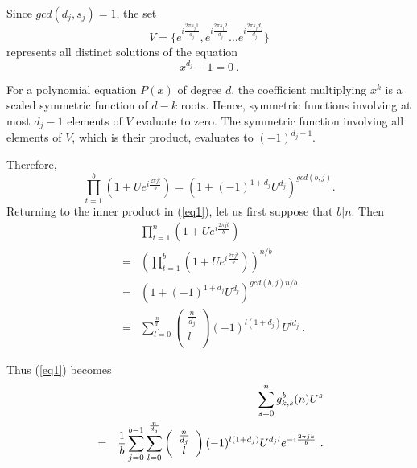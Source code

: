 Since $gcd(d_j,s_j)=1$, the set \[V=\{e^{i\frac{2\pi s_j 1}{d_j}},
e^{i\frac{2\pi s_j 2}{d_j}}\dots e^{i\frac{2\pi s_j d_j}{d_j}}\}\]
represents all distinct solutions of the equation
\begin{equation}\label{poly}
x^{d_j}-1=0~.
\end{equation}

For a polynomial equation $P(x)$ of degree $d$, the coefficient
multiplying $x^k$ is a scaled symmetric function of $d-k$ roots.
Hence, symmetric functions involving at most $d_j-1$ elements of $V$
evaluate to zero. The symmetric function involving all elements of
$V$, which is their product, evaluates to $(-1)^{d_j+1}$.

Therefore,
\begin{equation}
\prod_{t=1}^b (1+Ue^{i\frac{2\pi
jt}{b}})=\left(1+(-1)^{1+d_j}U^{d_j} \right)^{gcd(b,j)}.
\end{equation}
 Returning to the inner product in (\ref{eq1}), let us first
suppose that $b|n$. Then
\begin{equation}
\begin{array}{lll}
{}&{}&\prod_{t=1}^n \left(1+Ue^{i\frac{2\pi jt}{b}}\right)\\
{}&=&\left(\prod_{t=1}^b \left(1+Ue^{i\frac{2\pi
jt}{b}}\right)\right)^{n/b}\\
{}&=&\left(1+(-1)^{1+d_j}U^{d_j}
\right)^{gcd(b,j)n/b}\\
{}&=&\sum_{l=0}^{\frac{n}{d_j}} \left( \begin{array}{c}
                             \frac{n}{d_j} \\
                             l \\
                           \end{array}
                           \right)
(-1)^{l(1+d_j)}U^{ld_j}~.
\end{array}
\end{equation}

Thus (\ref{eq1}) becomes
\begin{eqnarray*}
{}&{}&\sum_{s=0}^n g^b_{k,s}(n)U^s\\&=&\frac{1}{b}\sum_{j=0}^{b-1}
\sum_{l=0}^{\frac{n}{d_j}} \left(
\begin{array}{c}
                             \frac{n}{d_j} \\
                             l \\
                           \end{array}
                           \right)(-1)^{l(1+d_j)}U^{d_jl}e^{-i\frac{2\pi
                           j k}{b}}~.\hspace{0.0in}
                           \end{eqnarray*}

